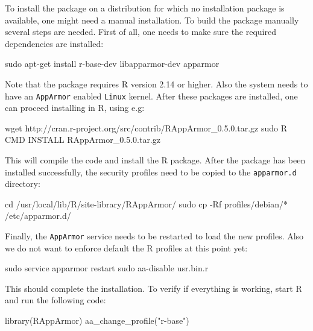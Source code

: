 \documentclass[article]{jss}
\newcommand{\R}{\textsf{R}\xspace}
\newcommand{\AppArmor}{\texttt{AppArmor}\xspace}
\newcommand{\RAppArmor}{\pkg{RAppArmor}\xspace}
\newcommand{\Linux}{\texttt{Linux}\xspace}
\begin{document}
To install the package on a distribution for which no installation package is
available, one might need a manual installation. To build the package manually
several steps are needed. First of all, one needs to make sure the required
dependencies are installed:

\begin{CodeChunk}
\begin{CodeInput}
sudo apt-get install r-base-dev libapparmor-dev apparmor
\end{CodeInput}
\end{CodeChunk}

Note that the package requires \R version 2.14 or higher. Also the
system needs to have an \AppArmor enabled \Linux kernel. After these packages
are installed, one can proceed installing \RAppArmor in \R, using
e.g:

\begin{CodeChunk}
\begin{CodeInput}
wget http://cran.r-project.org/src/contrib/RAppArmor_0.5.0.tar.gz
sudo R CMD INSTALL RAppArmor_0.5.0.tar.gz
\end{CodeInput}
\end{CodeChunk}

This will compile the  code and install the \R
package. After the package has been installed successfully, the security
profiles need to be copied to the \texttt{apparmor.d} directory:

\begin{CodeChunk}
\begin{CodeInput}
cd /usr/local/lib/R/site-library/RAppArmor/
sudo cp -Rf profiles/debian/* /etc/apparmor.d/
\end{CodeInput}
\end{CodeChunk}

Finally, the \AppArmor service needs to be restarted to load the new profiles.
Also we do not want to enforce default the \R profiles at this point yet:

\begin{CodeChunk}
\begin{CodeInput}
sudo service apparmor restart
sudo aa-disable usr.bin.r
\end{CodeInput}
\end{CodeChunk}

This should complete the installation. To verify if everything is working, start
\R and run the following code:

\begin{CodeChunk}
\begin{CodeInput}
library(RAppArmor)
aa_change_profile("r-base")
\end{CodeInput}
\end{CodeChunk}
\end{document}
